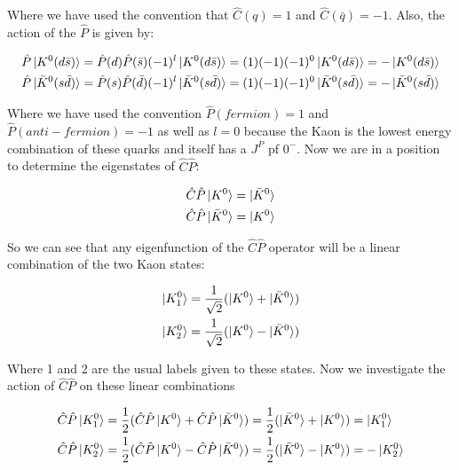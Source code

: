 \noindent Where we have used the convention that $\hat{C} (q) = 1$ and $\hat{C} (\bar{q}) = -1$. Also, the action of the $\hat{P}$ is given by:
    
\begin{align*}
\hat{P} \ket{K^{0}(d \bar{s})} = \hat{P}(d) \hat{P}(\bar{s})(-1)^{l} \ket{K^{0}(d \bar{s})} = (1)(-1)(-1)^0 \ket{K^{0}(d \bar{s})} = - \ket{K^{0}(d \bar{s})} \\
\hat{P} \ket{\bar{K}^{0}(s \bar{d})} = \hat{P}(s) \hat{P}(\bar{d})(-1)^{l} \ket{\bar{K}^{0}(s \bar{d})} = (1)(-1)(-1)^0 \ket{\bar{K}^{0}(s \bar{d})} = - \ket{\bar{K}^{0}(s \bar{d})} 
\end{align*}

\smallskip

\noindent Where we have used the convention $\hat{P} (fermion) = 1$ and $\hat{P} (anti-fermion) = -1$ as well as $l=0$ because the Kaon is the lowest energy combination of these quarks and itself has a $J^{P}$ pf $0^{-}$. Now we are in a position to determine the eigenstates of $\hat{C}\hat{P}$:

\begin{align*}
\hat{C}\hat{P} \ket{K^{0}} = \ket{\bar{K}^{0}} \\
\hat{C}\hat{P} \ket{\bar{K}^{0}} = \ket{K^{0}} 
\end{align*}

\noindent So we can see that any eigenfunction of the $\hat{C}\hat{P}$ operator will be a linear combination of the two Kaon states:

\begin{align}
\label{FirstKaonLinComb1}
\ket{K^{0}_{1}} = \frac{1}{\sqrt{2}} (\ket{K^{0}} + \ket{\bar{K}^{0}}) \\
\label{FirstKaonLinComb2}
\ket{K^{0}_{2}} = \frac{1}{\sqrt{2}} (\ket{K^{0}} - \ket{\bar{K}^{0}})
\end{align} 

\noindent Where 1 and 2 are the usual labels given to these states. Now we investigate the action of $\hat{C}\hat{P}$ on these linear combinations

\smallskip

\begin{align*}
\hat{C}\hat{P} \ket{K^{0}_{1}} & = \frac{1}{2} (\hat{C}\hat{P} \ket{K^{0}} + \hat{C}\hat{P} \ket{\bar{K}^{0}}) = \frac{1}{2} (\ket{\bar{K}^{0}} + \ket{K^{0}}) = \ket{K^{0}_{1}} \\
\hat{C}\hat{P} \ket{K^{0}_{2}} & = \frac{1}{2} (\hat{C}\hat{P} \ket{K^{0}} - \hat{C}\hat{P} \ket{\bar{K}^{0}}) =   \frac{1}{2} (\ket{\bar{K}^{0}} - \ket{K^{0}}) = - \ket{K^{0}_{2}} \\
\end{align*} 

